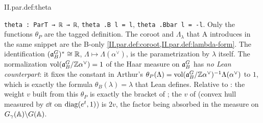 \begin{definition}
\end{definition}
\begin{tfformal}{II.par.def:theta}
\begin{tffidelity}
\texttt{theta : ParT → ℝ → ℝ}, \texttt{theta .B l = l}, \texttt{theta .Bbar l = -l}. Only the functions $\theta_P$ are the tagged definition. The coroot and $\Lambda_\lambda$ that A introduces in the same snippet are the B-only \cref{II.par.def:coroot,II.par.def:lambda-form}. The identification $(\mathfrak{a}_B^G)^*\cong\mathbb{R}$, $\Lambda\mapsto\Lambda(\alpha^\vee)$, is the parametrization by $\lambda$ itself. The normalization $\operatorname{vol}(\mathfrak{a}_B^G/\mathbb{Z}\alpha^\vee)=1$ of the Haar measure on $\mathfrak{a}_B^G$ has \emph{no Lean counterpart}: it fixes the constant in Arthur's $\theta_P(\Lambda)=\operatorname{vol}(\mathfrak{a}_B^G/\mathbb{Z}\alpha^\vee)^{-1}\Lambda(\alpha^\vee)$ to $1$, which is exactly the formula $\theta_B(\lambda)=\lambda$ that Lean defines. Relative to \cite{Gel}: the weight $v$ built from this $\theta_P$ is exactly the bracket of \cite[Lecture IV, Prop.~1.1]{Gel}; the $v$ of \cite[Lecture IV, §3]{Gel} (convex hull measured by $\dd t$ on $\operatorname{diag}(e^t,1)$) is $2v$, the factor being absorbed in the measure on $G_\gamma(\mathbb{A})\backslash G(\mathbb{A})$.
\end{tffidelity}
\end{tfformal}
